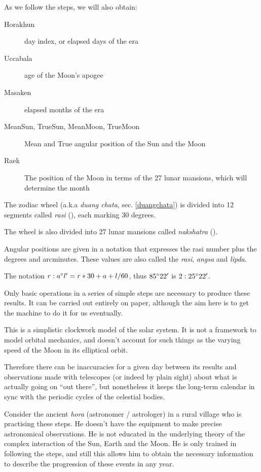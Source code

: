 \documentclass[11pt,oneside]{memoir-article}
\begin{document}
As we follow the steps, we will also obtain:

\begin{description}
\item[{Horakhun }] day index, or elapsed days of the era
\item[{Uccabala }] age of the Moon's apogee
\item[{Masaken }] elapsed months of the era

\item[{MeanSun, TrueSun, MeanMoon, TrueMoon}] Mean and True angular position of the Sun and the Moon
\item[{Raek}] The position of the Moon in terms of the 27 lunar mansions, which will determine the month
\end{description}

\spewnotes

The zodiac wheel (a.k.a \emph{duang chata}, sec. \ref{duangchata}) is divided into 12
segments called \emph{rasi} (), each marking 30 degrees.

The wheel is also divided into 27 lunar mansions called \emph{nakshatra}
().

Angular positions are given in a notation that expresses the rasi number plus
the degrees and arcminutes. These values are also called the \emph{rasi}, \emph{angsa} and
\emph{lipda}.

The notation $r:a^\circ l^\prime = r*30 + a + l/60$, thus $85^\circ 22^\prime$ is
$2:25^\circ 22^\prime$.


Only basic operations in a series of simple steps are necessary to produce these
results. It can be carried out entirely on paper, although the aim here is to
get the machine to do it for us eventually.

This is a simplistic clockwork model of the solar system. It is not a framework
to model orbital mechanics, and doesn't account for such things as the varying
speed of the Moon in its elliptical orbit.

Therefore there can be inaccuracies for a given day between its results and
observations made with telescopes (or indeed by plain sight) about what is
actually going on ``out there'', but nonetheless it keeps the long-term calendar
in sync with the periodic cycles of the celestial bodies.

Consider the ancient \emph{hora}  (astronomer / astrologer) in a rural village who is
practising these steps. He doesn't have the equipment to make precise
astronomical observations. He is not educated in the underlying theory of the
complex interaction of the Sun, Earth and the Moon. He is only trained in
following the steps, and still this allows him to obtain the necessary
information to describe the progression of these events in any year.
\end{document}
